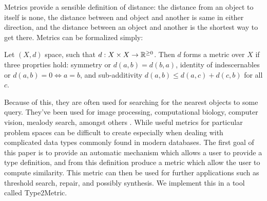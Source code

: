Metrics provide a sensible definition of distance:
the distance from an object to itself is none,
the distance between and object and another is same in either direction,
and the distance between an object and another is the shortest way to get there.
Metrics can be formalized simply:

\begin{definition}[Metric]
Let $(X, d)$ space, such that $d: X \times X \to \mathbb{R}^{\ge 0}$. 
Then $d$ forms a metric over $X$ if three proprties hold:
symmetry or $d(a, b) = d(b, a)$, identity of indescernables or $d(a, b) = 0 \iff a = b$,
and sub-additivity $d(a, b) \le d(a, c) + d(c, b)$ for all $c$.
\end{definition}

Because of this, they are often used for searching for the nearest objects to some query.
They've been used for image processing, computational biology, computer vision, mealody search, amongst others \cite{chen}.
While useful metrics for particular problem spaces can be difficult to create especially when dealing with complicated data types commonly found
in modern databases.
The first goal of this paper is to provide an automatic mechanism which allows a user to provide a type definition,
and from this definition produce a metric which allow the user to compute similarity.
This metric can then be used for further applications such as threshold search, repair, and possibly synthesis.
We implement this in a tool called Type2Metric.